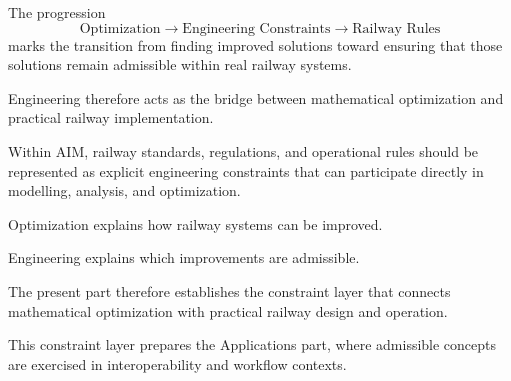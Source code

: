 The progression
\[
\text{Optimization}
\rightarrow
\text{Engineering Constraints}
\rightarrow
\text{Railway Rules}
\]
marks the transition from finding improved solutions toward ensuring
that those solutions remain admissible within real railway systems.

Engineering therefore acts as the bridge between mathematical
optimization and practical railway implementation.

\begin{principle}
\label{princ:engineering-constraint-principle}
Within AIM, railway standards, regulations, and operational rules
should be represented as explicit engineering constraints that can
participate directly in modelling, analysis, and optimization.
\end{principle}

\begin{summary}
Optimization explains how railway systems can be improved.

Engineering explains which improvements are admissible.

The present part therefore establishes the constraint layer that
connects mathematical optimization with practical railway design and
operation.
\end{summary}

This constraint layer prepares the Applications part, where admissible
concepts are exercised in interoperability and workflow contexts.

